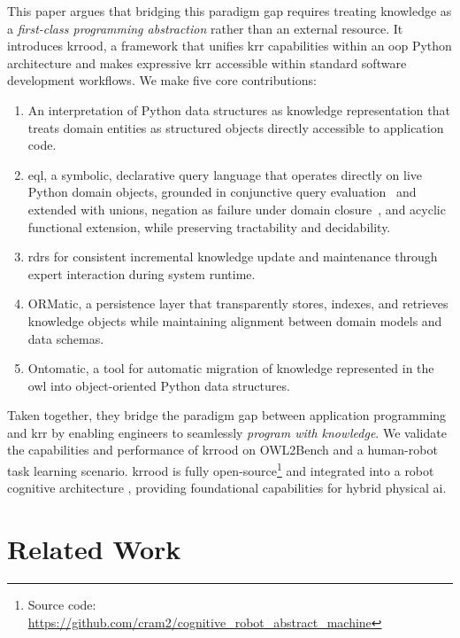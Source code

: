 \documentclass{article}
\begin{document}
This paper argues that bridging this paradigm gap requires treating knowledge as a \emph{first-class programming abstraction} rather than an external resource. It introduces \acf{krrood}, a framework that unifies \ac{krr} capabilities within an \ac{oop} Python architecture and makes expressive \ac{krr} accessible within standard software development workflows. We make five core contributions:

\begin{enumerate}
\item An interpretation of Python data structures as knowledge representation that treats domain entities as structured objects directly accessible to application code.

\item \acf{eql}, a symbolic, declarative query language that operates
directly on live Python domain objects, grounded in conjunctive query
evaluation~\cite{ChandraMerlin1977,AbiteboulHullVianu1995} and extended
with unions, negation as failure under domain
closure~\cite{ClarkCompletion1978,Reiter1978}, and acyclic functional
extension, while preserving tractability and decidability.

\item \Acp{rdr} for consistent incremental knowledge update and maintenance through expert interaction during system runtime.

\item ORMatic, a persistence layer that transparently stores, indexes, and retrieves knowledge objects while maintaining alignment between domain models and data schemas.

\item Ontomatic, a tool for automatic migration of knowledge represented in the \ac{owl} into object-oriented Python data structures.
\end{enumerate}

Taken together, they bridge the paradigm gap between application programming and \ac{krr} by enabling engineers to seamlessly \textit{program with knowledge}.
We validate the capabilities and performance of \ac{krrood} on OWL2Bench \cite{singh2020owl2bench} and a human-robot task learning scenario. \ac{krrood} is fully open-source\footnote{Source code: \url{https://github.com/cram2/cognitive_robot_abstract_machine}} and integrated into a robot cognitive architecture \cite{beetz2025robot}, providing foundational capabilities for hybrid physical \ac{ai}.

\section{Related Work}
\label{sec:related-work}
\end{document}
